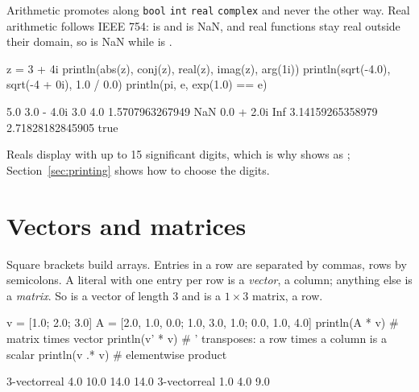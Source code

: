 \documentclass[11pt,a4paper,openany]{report}
\begin{document}
Arithmetic promotes along \texttt{bool} \textrightarrow{} \texttt{int}
\textrightarrow{} \texttt{real} \textrightarrow{} \texttt{complex} and never the
other way. Real arithmetic follows IEEE 754:  is  and
 is NaN, and real functions stay real outside their domain, so
 is NaN while  is .

\begin{axon}
z = 3 + 4i
println(abs(z), conj(z), real(z), imag(z), arg(1i))
println(sqrt(-4.0), sqrt(-4 + 0i), 1.0 / 0.0)
println(pi, e, exp(1.0) == e)
\end{axon}
\begin{axonout}
5.0 3.0 - 4.0i 3.0 4.0 1.5707963267949
NaN 0.0 + 2.0i Inf
3.14159265358979 2.71828182845905 true
\end{axonout}

Reals display with up to 15 significant digits, which is why 
shows as ; Section~\ref{sec:printing} shows how to choose the digits.

\section{Vectors and matrices}\label{sec:arrays}

Square brackets build arrays. Entries in a row are separated by commas, rows by
semicolons. A literal with one entry per row is a \emph{vector}, a column;
anything else is a \emph{matrix}. So \code{[1; 2; 3]} is a vector of length 3
and \code{[1, 2, 3]} is a $1\times3$ matrix, a row.

\begin{axon}
v = [1.0; 2.0; 3.0]
A = [2.0, 1.0, 0.0;
     1.0, 3.0, 1.0;
     0.0, 1.0, 4.0]
println(A * v)          # matrix times vector
println(v' * v)         # ' transposes: a row times a column is a scalar
println(v .* v)         # elementwise product
\end{axon}
\begin{axonout}
3-vector{real}
   4.0
  10.0
  14.0
14.0
3-vector{real}
  1.0
  4.0
  9.0
\end{axonout}
\end{document}
